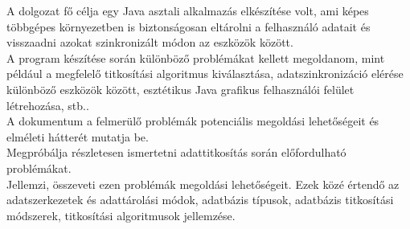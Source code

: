 
A dolgozat fő célja egy Java asztali alkalmazás elkészítése volt, ami képes többgépes környezetben is biztonságosan eltárolni a felhasználó adatait és visszaadni azokat szinkronizált módon az eszközök között.
\\ \indent A program készítése során különböző problémákat kellett megoldanom, mint például a megfelelő titkosítási algoritmus kiválasztása, adatszinkronizáció elérése különböző eszközök között, esztétikus Java grafikus felhasználói felület létrehozása, stb..
\\ \indent A dokumentum a felmerülő problémák potenciális megoldási lehetőségeit és elméleti hátterét mutatja be. 
\\ Megpróbálja részletesen ismertetni adattitkosítás során előfordulható problémákat. 
\\ Jellemzi, összeveti ezen problémák megoldási lehetőségeit. Ezek közé értendő az adatszerkezetek és adattárolási módok, adatbázis típusok, adatbázis titkosítási módszerek, titkosítási algoritmusok jellemzése. 

